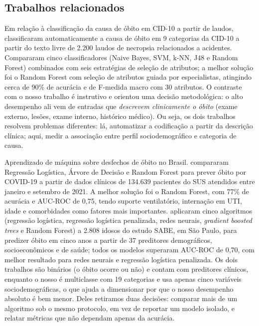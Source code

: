 \documentclass[12pt]{article}
\begin{document}
\subsection{Trabalhos relacionados}

Em relação à classificação da causa de óbito em CID-10 a partir de laudos, \cite{mujtaba2017} classificaram automaticamente a causa de óbito em 9 categorias da CID-10 a partir do texto livre de 2.200 laudos de necropsia relacionados a acidentes. Compararam cinco classificadores (Naive Bayes, SVM, k-NN, J48 e Random Forest) combinados com seis estratégias de seleção de atributos; a melhor solução foi o Random Forest com seleção de atributos guiada por especialistas, atingindo cerca de 90\% de acurácia e de F-medida macro com 30 atributos. O contraste com o nosso trabalho é instrutivo e orientou uma decisão metodológica: o alto desempenho ali vem de entradas que \emph{descrevem clinicamente o óbito} (exame externo, lesões, exame interno, histórico médico).  Ou seja, os dois trabalhos resolvem problemas diferentes: lá, automatizar a codificação a partir da descrição clínica; aqui, medir a associação entre perfil sociodemográfico e categoria de causa.

Aprendizado de máquina sobre desfechos de óbito no Brasil.
\cite{silva2022} compararam Regressão Logística, Árvore de Decisão e
Random Forest para prever óbito por COVID-19 a partir de dados clínicos de 134.639 pacientes do SUS atendidos entre janeiro e setembro de 2021. A melhor solução foi o Random Forest, com 77\% de acurácia e AUC-ROC de 0,75, tendo suporte ventilatório, internação em UTI, idade e comorbidades como fatores mais importantes. \cite{santos2019} aplicaram cinco algoritmos (regressão logística, regressão logística penalizada, redes neurais, \emph{gradient boosted trees} e Random Forest) a 2.808 idosos do estudo SABE, em São Paulo, para predizer óbito em cinco anos a partir de 37 preditores demográficos, socioeconômicos e de saúde; todos os modelos superaram AUC-ROC de 0,70, com melhor resultado para redes neurais e regressão logística penalizada. Os dois trabalhos são binários (o óbito ocorre ou não) e contam com preditores clínicos, enquanto o nosso é multiclasse com 19 categorias e usa apenas cinco variáveis sociodemográficas, o que ajuda a dimensionar por que o nosso desempenho absoluto é bem menor. Deles retiramos duas decisões: comparar mais de um algoritmo sob o mesmo protocolo, em vez de reportar um modelo isolado, e relatar métricas que não dependam apenas da
acurácia.
\end{document}
